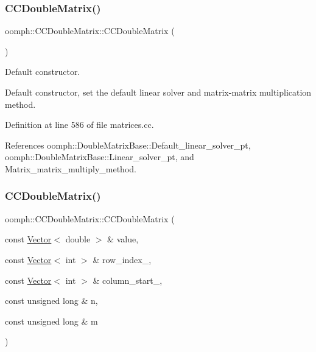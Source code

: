 \subsubsection{\texorpdfstring{C\+C\+Double\+Matrix()}{CCDoubleMatrix()}\hspace{0.1cm}{\footnotesize\ttfamily [1/3]}}
{\footnotesize\ttfamily oomph\+::\+C\+C\+Double\+Matrix\+::\+C\+C\+Double\+Matrix (\begin{DoxyParamCaption}{ }\end{DoxyParamCaption})}



Default constructor. 

Default constructor, set the default linear solver and matrix-\/matrix multiplication method. 

Definition at line 586 of file matrices.\+cc.



References oomph\+::\+Double\+Matrix\+Base\+::\+Default\+\_\+linear\+\_\+solver\+\_\+pt, oomph\+::\+Double\+Matrix\+Base\+::\+Linear\+\_\+solver\+\_\+pt, and Matrix\+\_\+matrix\+\_\+multiply\+\_\+method.

\mbox{\label{classoomph_1_1CCDoubleMatrix_ad98b162e3cc1aac48e9f5e1e06e262a5}} 
\subsubsection{\texorpdfstring{C\+C\+Double\+Matrix()}{CCDoubleMatrix()}\hspace{0.1cm}{\footnotesize\ttfamily [2/3]}}
{\footnotesize\ttfamily oomph\+::\+C\+C\+Double\+Matrix\+::\+C\+C\+Double\+Matrix (\begin{DoxyParamCaption}\item[{const \hyperlink{classoomph_1_1Vector}{Vector}$<$ double $>$ \&}]{value,  }\item[{const \hyperlink{classoomph_1_1Vector}{Vector}$<$ int $>$ \&}]{row\+\_\+index\+\_\+,  }\item[{const \hyperlink{classoomph_1_1Vector}{Vector}$<$ int $>$ \&}]{column\+\_\+start\+\_\+,  }\item[{const unsigned long \&}]{n,  }\item[{const unsigned long \&}]{m }\end{DoxyParamCaption})}



